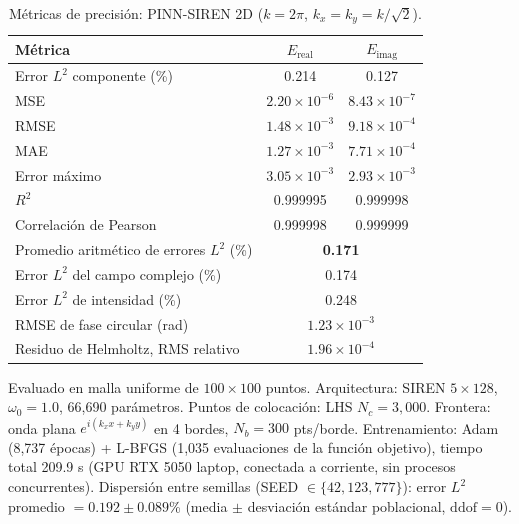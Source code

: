 \begin{table}[htbp]
\centering
\begin{threeparttable}
\caption{Métricas de precisión: PINN-SIREN 2D ($k = 2\pi$, $k_x = k_y = k/\sqrt{2}$).}
\label{tab:resultados2d}
\begin{tabular}{lcc}
\toprule
Métrica & $E_\text{real}$ & $E_\text{imag}$ \\
\midrule
Error $L^2$ componente (\%) & 0.214              & 0.127              \\
MSE                      & $2.20 \times 10^{-6}$ & $8.43 \times 10^{-7}$ \\
RMSE                     & $1.48 \times 10^{-3}$ & $9.18 \times 10^{-4}$ \\
MAE                      & $1.27 \times 10^{-3}$ & $7.71 \times 10^{-4}$ \\
Error máximo             & $3.05 \times 10^{-3}$ & $2.93 \times 10^{-3}$ \\
$R^2$                    & 0.999995           & 0.999998           \\
Correlación de Pearson   & 0.999998           & 0.999999           \\
\midrule
Promedio aritmético de errores $L^2$ (\%)& \multicolumn{2}{c}{\textbf{0.171}} \\
Error $L^2$ del campo complejo (\%)      & \multicolumn{2}{c}{0.174} \\
Error $L^2$ de intensidad (\%)           & \multicolumn{2}{c}{0.248} \\
RMSE de fase circular (rad)              & \multicolumn{2}{c}{$1.23 \times 10^{-3}$} \\
Residuo de Helmholtz, RMS relativo       & \multicolumn{2}{c}{$1.96 \times 10^{-4}$} \\
\bottomrule
\end{tabular}
\begin{tablenotes}\small
    \item Evaluado en malla uniforme de $100 \times 100$ puntos.
    Arquitectura: SIREN $5 \times 128$, $\omega_0 = 1.0$, 66{,}690 parámetros.
    Puntos de colocación: LHS $N_c = 3{,}000$.
    Frontera: onda plana $e^{i(k_x x + k_y y)}$ en 4 bordes, $N_b = 300$ pts/borde.
    Entrenamiento: Adam (8{,}737 épocas) + L-BFGS (1{,}035 evaluaciones de la
    función objetivo), tiempo total 209.9 s (GPU RTX 5050 laptop, conectada
    a corriente, sin procesos concurrentes).
    Dispersión entre semillas (SEED $\in \{42, 123, 777\}$):
    error $L^2$ promedio $= 0.192 \pm 0.089$\% (media $\pm$ desviación
    estándar poblacional, $\mathrm{ddof}=0$).
\end{tablenotes}
\end{threeparttable}
\end{table}

